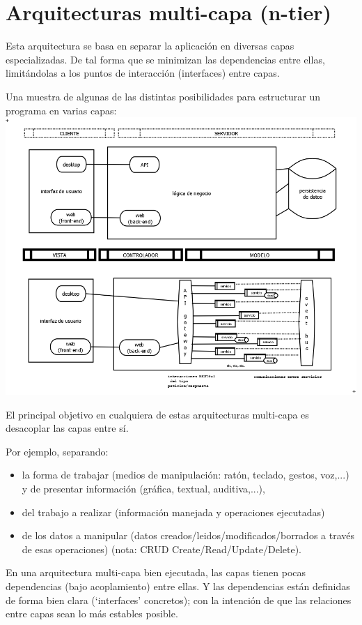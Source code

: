 \documentclass[spanish,12pt,a4paper,final,oneside]{book}
\begin{document}
\section{Arquitecturas multi-capa (n-tier)}\label{multicapa}
Esta arquitectura se basa en separar la aplicación en diversas capas especializadas. De tal forma que se minimizan las dependencias entre ellas, limitándolas a los puntos de interacción (interfaces) entre capas.

Una muestra de algunas de las distintas posibilidades para estructurar un programa en varias capas:
\\ \includegraphics[width=1.1\textwidth]{arquitecturas multicapa}

El principal objetivo en cualquiera de estas arquitecturas multi-capa es desacoplar las capas entre sí.

Por ejemplo, separando:
\begin{itemize}
\item la forma de trabajar (medios de manipulación: ratón, teclado, gestos, voz,...) y de presentar información (gráfica, textual, auditiva,...),
\item del trabajo a realizar (información manejada y operaciones ejecutadas) 
\item de los datos a manipular (datos creados/leidos/modificados/borrados a través de esas operaciones) (nota: CRUD Create/Read/Update/Delete).
\end{itemize}

En una arquitectura multi-capa bien ejecutada, las capas tienen pocas dependencias (bajo acoplamiento) entre ellas. Y las dependencias están definidas de forma bien clara (`interfaces' concretos); con la intención de que las relaciones entre capas sean lo más estables posible.
\end{document}
